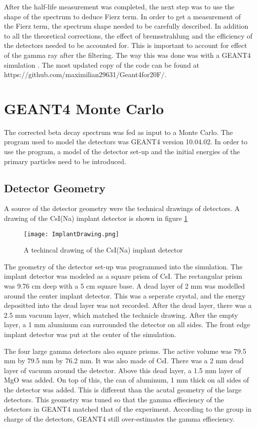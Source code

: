 \documentclass[../main.tex]{subfiles}
\begin{document}
After the half-life measurement was completed, the next step was to use the shape of the spectrum to deduce Fierz term. 
In order to get a measurement of the Fierz term, the spectrum shape needed to be carefully described.
In addition to all the theoretical corrections, the effect of bremsstrahlung and the efficiency of the detectors needed to be accounted for.
This is important to account for effect of the gamma ray after the filtering.
The way this was done was with a GEANT4 simulation \cite{Ago03}.
The most updated copy of the code can be found at https://github.com/maximilian29631/Geant4for20F/.


\section{GEANT4 Monte Carlo}
The corrected beta decay spectrum was fed as input to a Monte Carlo.
The program used to model the detectors was GEANT4 version 10.04.02.
In order to use the program, a model of the detector set-up and the initial energies of the primary particles need to be introduced.  

\subsection{Detector Geometry}
A source of the detector geometry were the technical drawings of detectors. 
A drawing of the CsI(Na) implant detector is shown in figure \ref{fig:ImplantTech}

\begin{figure}[!htb]
	\centerline{\texttt{[image: ImplantDrawing.png]}}
	\caption{A techincal drawing of the CsI(Na) implant detector}
	\label{fig:ImplantTech}
\end{figure}


The geometry of the detector set-up was programmed into the simulation.
The implant detector was modeled as a square prism of CsI.
The rectangular prism was 9.76 cm deep with a 5 cm square base.
A dead layer of 2 mm was modelled around the center implant detector.
This was a seperate crystal, and the energy depositted into the dead layer was not recorded.
After the dead layer, there was a 2.5 mm vacuum layer, which matched the technicle drawing.
After the empty layer, a 1 mm aluminum can surrounded the detector on all sides.  
The front edge implant detector was put at the center of the simulation.


The four large gamma detectors also square prisms.
The active volume was 79.5 mm by 79.5 mm by 76.2 mm.
It was also made of CsI.
There was a 2 mm dead layer of vacuum around the detector.
Above this dead layer, a 1.5 mm layer of MgO was added.
On top of this, the can of aluminum, 1 mm thick on all sides of the detector was added.
This is different than the acutal geometry of the large detectors.
This geometry was tuned so that the gamma effieciency of the detectors in GEANT4 matched that of the experiment.
According to the group in charge of the detectors, GEANT4 still over-estimates the gamma effieciency. 
\end{document}
